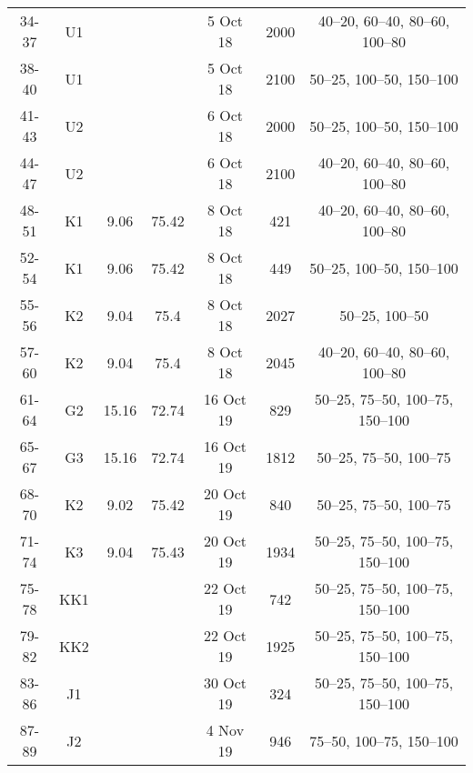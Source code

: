 \documentclass{article}
\begin{document}
\begin{table}[htbp]
{\begin{adjustwidth}{0in}{0in}
\begin{tabular}{ccccccc}
				34-37       & U1  &            &            & 5 Oct 18                  & 2000       & 40–20, 60–40, 80–60, 100–80   \\
				38-40       & U1  &            &            & 5 Oct 18                  & 2100       & 50–25, 100–50, 150–100        \\
				41-43       & U2  &            &            & 6 Oct 18                  & 2000       & 50–25, 100–50, 150–100        \\
				44-47       & U2  &            &            & 6 Oct 18                  & 2100       & 40–20, 60–40, 80–60, 100–80   \\
				48-51       & K1  & 9.06       & 75.42      & 8 Oct 18                  & 421        & 40–20, 60–40, 80–60, 100–80   \\
				52-54       & K1  & 9.06       & 75.42      & 8 Oct 18                  & 449        & 50–25, 100–50, 150–100        \\
				55-56       & K2  & 9.04       & 75.4       & 8 Oct 18                  & 2027       & 50–25, 100–50                 \\
				57-60       & K2  & 9.04       & 75.4       & 8 Oct 18                  & 2045       & 40–20, 60–40, 80–60, 100–80   \\
				\midrule
				61-64       & G2  & 15.16      & 72.74      & 16 Oct 19                 & 829        & 50–25, 75–50, 100–75, 150–100 \\
				65-67       & G3  & 15.16      & 72.74      & 16 Oct 19                 & 1812       & 50–25, 75–50, 100–75          \\
				68-70       & K2  & 9.02       & 75.42      & 20 Oct 19                 & 840        & 50–25, 75–50, 100–75          \\
				71-74       & K3  & 9.04       & 75.43      & 20 Oct 19                 & 1934       & 50–25, 75–50, 100–75, 150–100 \\
				75-78       & KK1 &            &            & 22 Oct 19                 & 742        & 50–25, 75–50, 100–75, 150–100 \\
				79-82       & KK2 &            &            & 22 Oct 19                 & 1925       & 50–25, 75–50, 100–75, 150–100 \\
				83-86         & J1  &            &            & 30 Oct 19                 & 324        & 50–25, 75–50, 100–75, 150–100 \\
				87-89         & J2  &            &            & 4 Nov 19                  & 946        & 75–50, 100–75, 150–100        \\

\end{tabular}
\end{adjustwidth}}
\end{table}
\end{document}
